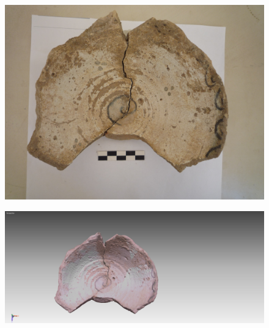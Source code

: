\documentclass{beamer}
\begin{document}
		\begin{frame}
			\begin{multicols}{2}[][]
				\begin{figure}[]
					\begin{center}
						\includegraphics[width=1\linewidth]{snap3d/vaso1}
					\end{center}
					\label{fig:vaso1}
				\end{figure}
				\begin{figure}[]
					\begin{center}
						\includegraphics[width=1\linewidth,trim=50 0 230 0,clip=true]{snap3d/vaso2}
					\end{center}
					\label{fig:vaso2}
				\end{figure}
			\end{multicols}
		\end{frame}
\end{document}
